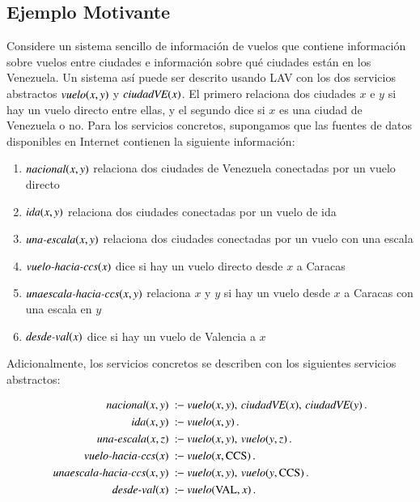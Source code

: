 \subsection{Ejemplo Motivante}

\newcommand{\vuelo}{\text{\it vuelo}}
\newcommand{\ciudadVE}{\text{\it ciudadVE}}
\newcommand{\nacional}{\text{\it nacional}}
\newcommand{\ida}{\text{\it ida}}
\newcommand{\unaescala}{\text{\it una-escala}}
\newcommand{\vueloCCS}{\text{\it vuelo-hacia-ccs}}
\newcommand{\unaparadaCCS}{\text{\it unaescala-hacia-ccs}}
\newcommand{\desdeVAL}{\text{\it desde-val}}
\newcommand{\PA}{\text{CCS}}
\newcommand{\NY}{\text{VAL}}
\newcommand{\AL}{\text{AL}}

Considere un sistema sencillo de información de vuelos que contiene información
sobre vuelos entre ciudades e información sobre qué ciudades están en los
Venezuela. Un sistema así puede ser descrito usando LAV con los dos servicios
abstractos $\vuelo(x,y)$ y $\ciudadVE(x)$. El primero relaciona dos ciudades $x$ e $y$ si
hay un vuelo directo entre ellas, y el segundo dice si $x$ es una ciudad de
Venezuela  o no. Para los servicios concretos, supongamos que las fuentes de
datos disponibles en Internet contienen la siguiente información:

\begin{enumerate}[--]
\item $\nacional(x,y)$ relaciona dos ciudades de Venezuela conectadas por un vuelo directo
\item $\ida(x,y)$ relaciona dos ciudades conectadas por un vuelo de ida
\item $\unaescala(x,y)$ relaciona dos ciudades conectadas por un vuelo con una escala
\item $\vueloCCS(x)$ dice si hay un vuelo directo desde $x$ a Caracas
\item $\unaparadaCCS(x,y)$ relaciona $x$ y $y$ si hay un vuelo desde $x$ a Caracas con una escala en $y$
\item $\desdeVAL(x)$ dice si hay un vuelo de Valencia a $x$
\end{enumerate}

Adicionalmente, los servicios concretos se describen con los siguientes
servicios abstractos:

\begin{alignat*}{1}
\nacional(x,y)\   &\qrule\ \vuelo(x,y),\,\ciudadVE(x),\,\ciudadVE(y)\,. \\
\ida(x,y)\     &\qrule\ \vuelo(x,y)\,. \\
\unaescala(x,z)\    &\qrule\ \vuelo(x,y),\,\vuelo(y,z)\,. \\
\vueloCCS(x)\     &\qrule\ \vuelo(x,\PA)\,. \\
\unaparadaCCS(x,y)\  &\qrule\ \vuelo(x,y),\,\vuelo(y,\PA)\,. \\
\desdeVAL(x)\       &\qrule\ \vuelo(\NY,x)\,.
\end{alignat*}

